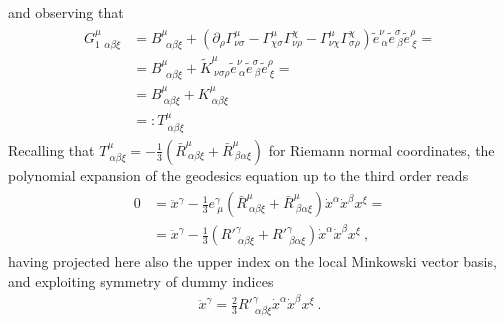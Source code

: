 \documentclass[letterpaper,10pt,english]{jupyterBook}
\begin{document}
\sphinxAtStartPar
and observing that
\begin{equation*}
\begin{split}\begin{aligned}
  G^{\mu}_{1\ \ \alpha \beta \xi}
  & = B^{\mu}_{\ \ \alpha \beta \xi} + \left( \partial_{\rho} \Gamma^{\mu}_{\nu \sigma} - \Gamma^{\mu}_{\chi \sigma} \Gamma^{\chi}_{\nu \rho} - \Gamma^{\mu}_{\nu \chi} \Gamma^{\chi}_{\sigma \rho} \right) \widetilde{e}^{\nu}_{\ \alpha} \widetilde{e}^{\sigma}_{\ \beta} \widetilde{e}^{\rho}_{\ \xi} = \\
  & = B^{\mu}_{\ \ \alpha \beta \xi} + \widetilde{K}^{\mu}_{\ \nu \sigma \rho} \widetilde{e}^{\nu}_{\ \alpha} \widetilde{e}^{\sigma}_{\ \beta} \widetilde{e}^{\rho}_{\ \xi} = \\
  & = B^{\mu}_{\ \alpha \beta \xi} + K^{\mu}_{\ \alpha \beta \xi} \\
  & =: T^{\mu}_{\ \alpha \beta \xi}
\end{aligned}\end{split}
\end{equation*}
\sphinxAtStartPar
Recalling that \(T^{\mu}_{\ \alpha \beta \xi} = - \tfrac{1}{3} \left( \bar{R}^{\mu}_{\ \alpha \beta \xi} + \bar{R}^{\mu}_{\ \beta \alpha \xi} \right)\) for Riemann normal coordinates, the polynomial expansion of the geodesics equation up to the third order reads
\begin{equation*}
\begin{split}\begin{aligned}
  0 
  & = \ddot{x}^\gamma - \frac{1}{3} e^\gamma_{\ \mu} \left( \bar{R}^{\mu}_{\ \alpha \beta \xi} + \bar{R}^{\mu}_{\ \beta \alpha \xi} \right) \dot{x}^\alpha \dot{x}^\beta x^\xi = \\
  & = \ddot{x}^\gamma - \frac{1}{3} \left( {R'}^{\gamma}_{\ \alpha \beta \xi} + {R'}^{\gamma}_{\ \beta \alpha \xi} \right) \dot{x}^\alpha \dot{x}^\beta x^\xi \ ,
\end{aligned}\end{split}
\end{equation*}
\sphinxAtStartPar
having projected here also the upper index on the local Minkowski vector basis, and exploiting symmetry of dummy indices
\begin{equation*}
\begin{split}
  \ddot{x}^\gamma = \frac{2}{3} {R'}^{\gamma}_{\ \alpha \beta \xi} \dot{x}^\alpha \dot{x}^\beta x^\xi \ .
\end{split}
\end{equation*}
\end{document}
